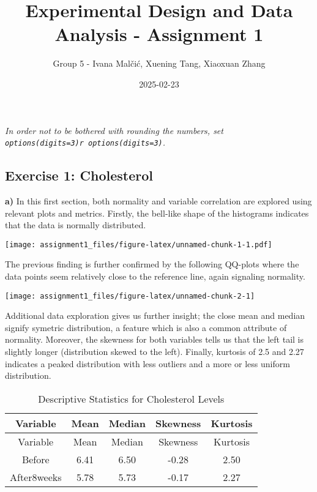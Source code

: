 \documentclass[
]{article}
\title{Experimental Design and Data Analysis - Assignment 1}
\author{Group 5 - Ivana Malčić, Xuening Tang, Xiaoxuan Zhang}
\date{2025-02-23}
\begin{document}
\maketitle

\emph{In order not to be bothered with rounding the numbers, set
\texttt{options(digits=3)r\ options(digits=3)}.}

\subsection{Exercise 1: Cholesterol}\label{exercise-1-cholesterol}

\textbf{a)} In this first section, both normality and variable
correlation are explored using relevant plots and metrics. Firstly, the
bell-like shape of the histograms indicates that the data is normally
distributed.

\texttt{[image: assignment1\_files/figure-latex/unnamed-chunk-1-1.pdf]}

The previous finding is further confirmed by the following QQ-plots
where the data points seem relatively close to the reference line, again
signaling normality.

\begin{center}\texttt{[image: assignment1\_files/figure-latex/unnamed-chunk-2-1]} \end{center}

Additional data exploration gives us further insight; the close mean and
median signify symetric distribution, a feature which is also a common
attribute of normality. Moreover, the skewness for both variables tells
us that the left tail is slightly longer (distribution skewed to the
left). Finally, kurtosis of 2.5 and 2.27 indicates a peaked distribution
with less outliers and a more or less uniform distribution.

\begin{longtable}[]{@{}ccccc@{}}
\caption{Descriptive Statistics for Cholesterol Levels}\tabularnewline
\toprule\noalign{}
Variable & Mean & Median & Skewness & Kurtosis \\
\midrule\noalign{}
\endfirsthead
\toprule\noalign{}
Variable & Mean & Median & Skewness & Kurtosis \\
\midrule\noalign{}
\endhead
\bottomrule\noalign{}
\endlastfoot
Before & 6.41 & 6.50 & -0.28 & 2.50 \\
After8weeks & 5.78 & 5.73 & -0.17 & 2.27 \\
\end{longtable}
\end{document}
